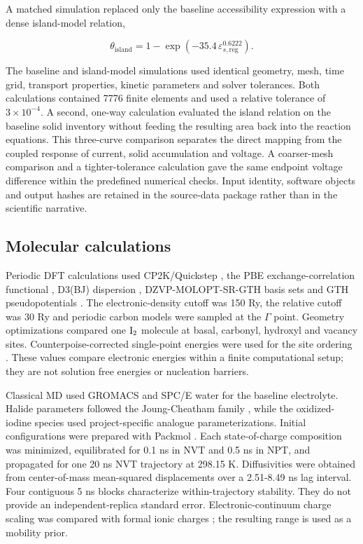 \documentclass[11pt]{article}
\begin{document}
A matched simulation replaced only the baseline accessibility expression with a dense island-model relation,

\[
\theta_{\mathrm{island}}=1-\exp\left(-35.4\,\varepsilon_{s,\mathrm{reg}}^{0.6222}\right).
\]

The baseline and island-model simulations used identical geometry, mesh, time grid, transport properties, kinetic parameters and solver tolerances. Both calculations contained 7776 finite elements and used a relative tolerance of $3\times10^{-4}$. A second, one-way calculation evaluated the island relation on the baseline solid inventory without feeding the resulting area back into the reaction equations. This three-curve comparison separates the direct mapping from the coupled response of current, solid accumulation and voltage. A coarser-mesh comparison and a tighter-tolerance calculation gave the same endpoint voltage difference within the predefined numerical checks. Input identity, software objects and output hashes are retained in the source-data package rather than in the scientific narrative.

\subsection{Molecular calculations}


Periodic DFT calculations used CP2K/Quickstep \citep{Kuhne2020CP2K,VandeVondele2005Quickstep}, the PBE exchange-correlation functional \citep{Perdew1996PBE}, D3(BJ) dispersion \citep{Grimme2010D3,Grimme2011D3BJ}, DZVP-MOLOPT-SR-GTH basis sets \citep{VandeVondele2007MOLOPT} and GTH pseudopotentials \citep{Goedecker1996GTH,Hartwigsen1998GTH,Krack2005GTHPBE}. The electronic-density cutoff was 150 Ry, the relative cutoff was 30 Ry and periodic carbon models were sampled at the $\Gamma$ point. Geometry optimizations compared one $\ce{I2}$ molecule at basal, carbonyl, hydroxyl and vacancy sites. Counterpoise-corrected single-point energies were used for the site ordering \citep{Boys1970Counterpoise}. These values compare electronic energies within a finite computational setup; they are not solution free energies or nucleation barriers.

Classical MD used GROMACS \citep{Abraham2015GROMACS} and SPC/E water \citep{Berendsen1987SPCE} for the baseline electrolyte. Halide parameters followed the Joung-Cheatham family \citep{Joung2008Ions}, while the oxidized-iodine species used project-specific analogue parameterizations. Initial configurations were prepared with Packmol \citep{Martinez2009Packmol}. Each state-of-charge composition was minimized, equilibrated for 0.1 ns in NVT and 0.5 ns in NPT, and propagated for one 20 ns NVT trajectory at 298.15 K. Diffusivities were obtained from center-of-mass mean-squared displacements over a 2.51-8.49 ns lag interval. Four contiguous 5 ns blocks characterize within-trajectory stability. They do not provide an independent-replica standard error. Electronic-continuum charge scaling was compared with formal ionic charges \citep{Leontyev2009ECC}; the resulting range is used as a mobility prior.
\end{document}
